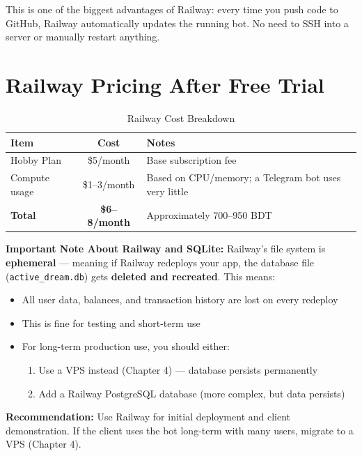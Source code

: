 \begin{tipbox}
This is one of the biggest advantages of Railway: every time you push code to GitHub, Railway automatically updates the running bot. No need to SSH into a server or manually restart anything.
\end{tipbox}

\section{Railway Pricing After Free Trial}

\begin{table}[H]
\centering
\caption{Railway Cost Breakdown}
\begin{tabularx}{\textwidth}{|l|c|X|}
\hline
\textbf{Item} & \textbf{Cost} & \textbf{Notes} \\
\hline
Hobby Plan & \$5/month & Base subscription fee \\
\hline
Compute usage & \$1--3/month & Based on CPU/memory; a Telegram bot uses very little \\
\hline
\textbf{Total} & \textbf{\$6--8/month} & Approximately 700--950 BDT \\
\hline
\end{tabularx}
\end{table}

\begin{warningbox}
\textbf{Important Note About Railway and SQLite:} Railway's file system is \textbf{ephemeral} --- meaning if Railway redeploys your app, the database file (\texttt{active\_dream.db}) gets \textbf{deleted and recreated}. This means:
\begin{itemize}
    \item All user data, balances, and transaction history are lost on every redeploy
    \item This is fine for testing and short-term use
    \item For long-term production use, you should either:
    \begin{enumerate}
        \item Use a VPS instead (Chapter 4) --- database persists permanently
        \item Add a Railway PostgreSQL database (more complex, but data persists)
    \end{enumerate}
\end{itemize}
\textbf{Recommendation:} Use Railway for initial deployment and client demonstration. If the client uses the bot long-term with many users, migrate to a VPS (Chapter 4).
\end{warningbox}
